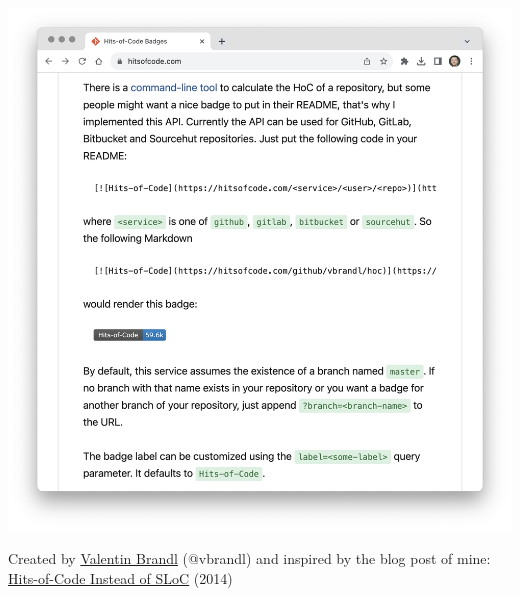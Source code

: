 \documentclass{article}
\begin{document}
\begin{multicols}{2}
\includegraphics[width=.9\columnwidth]{hitsofcode.png}
\par\columnbreak\par
Created by \href{https://www.vbrandl.net/}{Valentin Brandl} (@vbrandl)
and inspired by the blog post of mine:
\href{https://www.yegor256.com/2014/11/14/hits-of-code.html}{Hits-of-Code Instead of SLoC} (2014)
\end{multicols}
\plush{}

\end{document}
